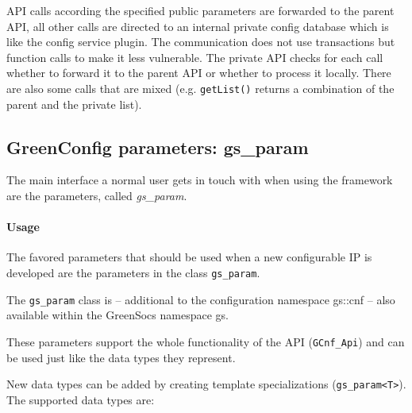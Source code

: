 API calls according the specified public parameters are forwarded to the parent API, all other calls are directed to an internal private config database which is like the config service plugin. The communication does not use transactions but function calls to make it less vulnerable. The private API checks for each call whether to forward it to the parent API or whether to process it locally. There are also some calls that are mixed (e.g. \lstinline|getList()| returns a combination of the parent and the private list).


\subsection{GreenConfig parameters: gs\_param}
\label{GCnfGsParam}

The main interface a normal user gets in touch with when using the \GreenConfig framework are the \GreenConfig parameters, called {\em gs\_param}.

\paragraph{Usage}The favored parameters that should be used when a new configurable IP is developed are the \GreenConfig parameters in the class \lstinline|gs_param|.

The \lstinline|gs_param| class is -- additional to the configuration namespace {\sffamily gs::cnf} -- also available within the GreenSocs namespace {\sffamily gs}.

These parameters support the whole functionality of the \GreenConfig API (\lstinline|GCnf_Api|) and
can  be used just like the data types they represent.

New data types can be added by creating template specializations (\lstinline|gs_param<T>|).  \newline  The supported data types are:

